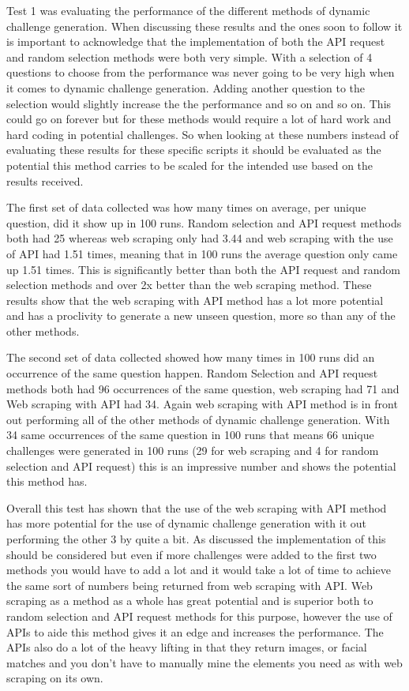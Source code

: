 \documentclass[12pt,a4paper]{article}
\begin{document}
Test 1 was evaluating the performance of the different methods of dynamic challenge generation. When discussing these results and the ones soon to follow it is important to acknowledge that the implementation of both the API request and random selection methods were both very simple. With a selection of 4 questions to choose from the performance was never going to be very high when it comes to dynamic challenge generation. Adding another question to the selection would slightly increase the the performance and so on and so on. This could go on forever but for these methods would require a lot of hard work and hard coding in potential challenges. So when looking at these numbers instead of evaluating these results for these specific scripts it should be evaluated as the potential this method carries to be scaled for the intended use based on the results received.  

The first set of data collected was how many times on average, per unique question, did it show up in 100 runs. Random selection and API request methods both had 25 whereas web scraping only had 3.44 and web scraping with the use of API had 1.51 times, meaning that in 100 runs the average question only came up 1.51 times. This is significantly better than both the API request and random selection methods and over 2x better than the web scraping method. These results show that the web scraping with API method has a lot more potential and has a proclivity to generate a new unseen question, more so than any of the other methods. 

The second set of data collected showed how many times in 100 runs did an occurrence of the same question happen. Random Selection and API request methods both had 96 occurrences of the same question, web scraping had 71 and Web scraping with API had 34. Again web scraping with API method is in front out performing all of the other methods of dynamic challenge generation. With 34 same occurrences of the same question in 100 runs that means 66 unique challenges were generated in 100 runs (29 for web scraping and 4 for random selection and API request) this is an impressive number and shows the potential this method has. 

Overall this test has shown that the use of the web scraping with API method has more potential for the use of dynamic challenge generation with it out performing the other 3 by quite a bit. As discussed the implementation of this should be considered but even if more challenges were added to the first two methods you would have to add a lot and it would take a lot of time to achieve the same sort of numbers being returned from web scraping with API. Web scraping as a method as a whole has great potential and is superior both to random selection and API request methods for this purpose, however the use of APIs to aide this method gives it an edge and increases the performance. The APIs also do a lot of the heavy lifting in that they return images, or facial matches and you don't have to manually mine the elements you need as with web scraping on its own.
\end{document}
